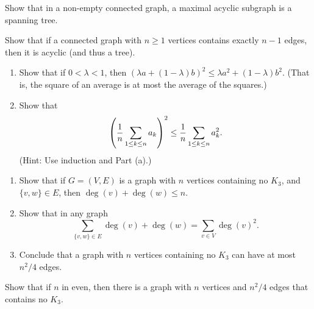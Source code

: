 \documentclass[12pt,letterpaper]{hmcpset}
\newcommand{\la}{\lambda}
\begin{document}

\begin{problem}[1]
    Show that in a non-empty connected graph, a maximal acyclic subgraph is a spanning tree.
\end{problem}
\begin{solution}
    \vfill
\end{solution}
\newpage

\begin{problem}[2]
    Show that if a connected graph with $n\ge 1$ vertices contains exactly $n-1$ edges, then it is acyclic (and thus a tree).
\end{problem}
\begin{solution}
    \vfill
\end{solution}
\newpage

\begin{problem}[3]
    \begin{enumerate}
        \item Show that if $0<\la<1$, then $(\la a + (1-\la)b)^2 \le \la a^2 + (1-\la) b^2$. (That is, the square of an average is at most the average of the squares.)
        \item  Show that $$\left({1\over n}\sum_{1\le k\le n} a_k\right)^2 \le {1\over n} \sum_{1\le k\le n} a_k^2.$$ (Hint: Use induction and Part (a).)
    \end{enumerate}
\end{problem}
\begin{solution}
    \vfill
\end{solution}
\newpage

\begin{problem}[4]
    \begin{enumerate}
        \item Show that if $G=(V,E)$ is a graph with $n$ vertices containing no $K_3$, and $\{v,w\}\in E$, then $\deg(v) + \deg(w)\le n$.
        \item Show that in any graph $$\sum_{\{v,w\}\in E} \deg(v) + \deg(w) = \sum_{v\in V} \deg(v)^2.$$
        \item Conclude that a graph with $n$ vertices containing no $K_3$ can have at most $n^2/4$ edges.
    \end{enumerate}
\end{problem}
\begin{solution}
    \vfill
\end{solution}
\newpage

\begin{problem}[5]
    Show that if $n$ in even, then there is a graph with $n$ vertices and $n^2/4$ edges that contains no $K_3$.
\end{problem}
\begin{solution}
    \vfill
\end{solution}
\end{document}
